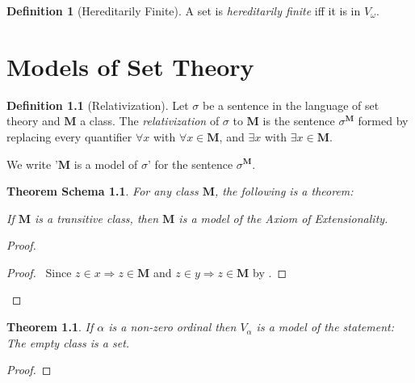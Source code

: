 \documentclass{book}
\let\qed\relax
\newtheorem{thm}[ax]{Theorem}
\newtheorem{thms}[ax]{Theorem Schema}
\theoremstyle{definition}
\newtheorem{df}[ax]{Definition}
\begin{document}
\begin{df}[Hereditarily Finite]
A set is \emph{hereditarily finite} iff it is in $V_\omega$.
\end{df}

\chapter{Models of Set Theory}

\begin{df}[Relativization]
Let $\sigma$ be a sentence in the language of set theory and $\mathbf{M}$ a class. The \emph{relativization} of $\sigma$ to $\mathbf{M}$ is the sentence $\sigma^\mathbf{M}$ formed by replacing every quantifier $\forall x$ with $\forall x \in \mathbf{M}$, and $\exists x$ with $\exists x \in \mathbf{M}$.

We write '$\mathbf{M}$ is a model of $\sigma$' for the sentence $\sigma^\mathbf{M}$.
\end{df}

\begin{thms}
\label{thm:modelExtensionality}
For any class $\mathbf{M}$, the following is a theorem:

If $\mathbf{M}$ is a transitive class, then $\mathbf{M}$ is a model of the Axiom of Extensionality.
\end{thms}

\begin{proof}
\pf
{}
\begin{proof}
	\pf\ Since $z \in x \Rightarrow z \in \mathbf{M}$ and $z \in y \Rightarrow z \in \mathbf{M}$ by .
\end{proof}
\qed
\end{proof}

\begin{thm}
\label{thm:modelEmptySet}
If $\alpha$ is a non-zero ordinal then $V_\alpha$ is a model of the statement: The empty class is a set.
\end{thm}

\begin{proof}
\pf
{}
\qed
\end{proof}
\end{document}
